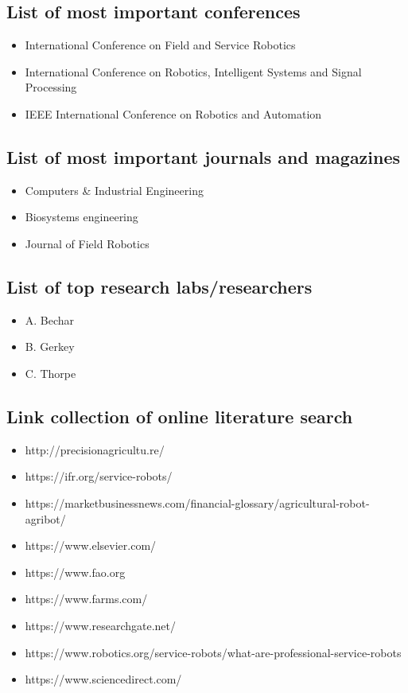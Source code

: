     \subsection{List of most important conferences}
    \begin{itemize}
        \item International Conference on Field and Service Robotics
        \item International Conference on Robotics, Intelligent Systems and Signal Processing
        \item IEEE International Conference on Robotics and Automation
    \end{itemize}
    \subsection{List of most important journals and magazines}
    \begin{itemize}
        \item Computers {\&} Industrial Engineering
        \item Biosystems engineering
        \item Journal of Field Robotics
    \end{itemize}
    \subsection{List of top research labs/researchers}
    \begin{itemize}
        \item A. Bechar 
        \item B. Gerkey
        \item C. Thorpe 
    \end{itemize}
    \subsection{Link collection of online literature search}
    \begin{itemize}
        \item http://precisionagricultu.re/
        \item https://ifr.org/service-robots/
        \item https://marketbusinessnews.com/financial-glossary/agricultural-robot-agribot/
        \item https://www.elsevier.com/
        \item https://www.fao.org
        \item https://www.farms.com/
        \item https://www.researchgate.net/
        \item https://www.robotics.org/service-robots/what-are-professional-service-robots
        \item https://www.sciencedirect.com/
    \end{itemize}
